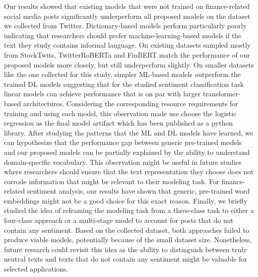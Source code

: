 Our results showed that existing models that were not trained on finance-related social media posts significantly underperform all proposed models on the dataset we collected from Twitter. Dictionary-based models perform particularly poorly indicating that researchers should prefer machine-learning-based models if the text they study contains informal language. On existing datasets sampled mostly from StockTwits, TwitterRoBERTa and FinBERT match the performance of our proposed models more closely, but still underperform slightly. On smaller datasets like the one collected for this study, simpler ML-based models outperform the trained DL models suggesting that for the studied sentiment classification task linear models can achieve performance that is on par with larger transformer-based architectures. Considering the corresponding resource requirements for training and using each model, this observation made use choose the logistic regression as the final model artifact which has been published as a python library.\newline
After studying the patterns that the ML and DL models have learned, we can hypothesize that the performance gap between generic pre-trained models and our proposed models can be partially explained by the ability to understand domain-specific vocabulary. This observation might be useful in future studies where researchers should ensure that the text representation they choose does not corrode information that might be relevant to their modeling task. For finance-related sentiment analysis, our results have shown that generic, pre-trained word embeddings might not be a good choice for this exact reason.\newline
Finally, we briefly studied the idea of reframing the modeling task from a three-class task to either a four-class approach or a multi-stage model to account for posts that do not contain any sentiment. Based on the collected dataset, both approaches failed to produce viable models, potentially because of the small dataset size. Nonetheless, future research could revisit this idea as the ability to distinguish between truly neutral texts and texts that do not contain any sentiment might be valuable for selected applications.

